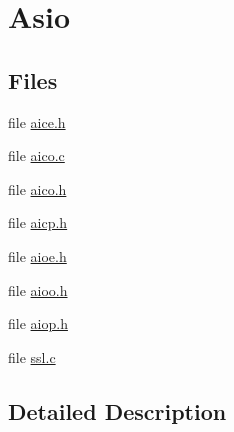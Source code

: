\hypertarget{group__asio}{\section{Asio}
\label{group__asio}
}
\subsection*{Files}
\begin{DoxyCompactItemize}
\item 
file \hyperlink{aice_8h}{aice.\-h}
\item 
file \hyperlink{aico_8c}{aico.\-c}
\item 
file \hyperlink{aico_8h}{aico.\-h}
\item 
file \hyperlink{aicp_8h}{aicp.\-h}
\item 
file \hyperlink{aioe_8h}{aioe.\-h}
\item 
file \hyperlink{aioo_8h}{aioo.\-h}
\item 
file \hyperlink{aiop_8h}{aiop.\-h}
\item 
file \hyperlink{ssl_8c}{ssl.\-c}
\end{DoxyCompactItemize}


\subsection{Detailed Description}
